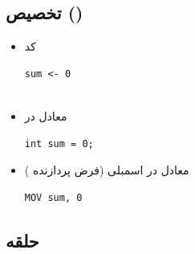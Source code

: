 \documentclass[11pt, a4paper, oneside]{book}
\begin{document}
			\subsection{تخصیص ()}
			
				\begin{itemize}
					
					\item کد 
					\begin{latin}
						\begin{lstlisting}[caption={\lr{R Assignment}}] 
sum <- 0
							
						\end{lstlisting}
					\end{latin}
					
					\item معادل در 
					\begin{latin}
						\begin{lstlisting}[caption={\lr{C Assignment}}] 
int sum = 0;

						\end{lstlisting}
					\end{latin}
					
					\item معادل در اسمبلی (فرض پردازنده )
					\begin{latin}
						\begin{lstlisting}[caption={\lr{Assembly Assignment}}] 
MOV sum, 0

						\end{lstlisting}
					\end{latin}
					
				\end{itemize}
				
				
			\subsection{حلقه }
				
\end{document}
